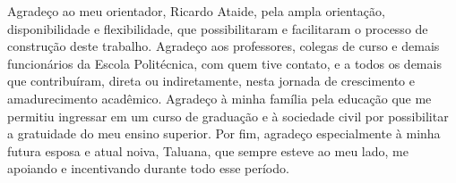 \begin{agradecimentos}

\noindent Agradeço ao meu orientador, Ricardo Ataide, pela ampla orientação, disponibilidade e flexibilidade, que
possibilitaram e facilitaram o processo de construção deste trabalho.
Agradeço aos professores, colegas de curso e demais funcionários da Escola Politécnica, com quem tive
contato, e a todos os demais que contribuíram, direta ou indiretamente, nesta jornada de crescimento e
amadurecimento acadêmico.
Agradeço à minha família pela educação que me permitiu ingressar em um curso de graduação e à sociedade
civil por possibilitar a gratuidade do meu ensino superior.
Por fim, agradeço especialmente à minha futura esposa e atual noiva, Taluana, que sempre esteve ao meu
lado, me apoiando e incentivando durante todo esse período.  

\end{agradecimentos}
